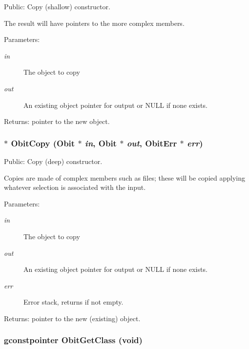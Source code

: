 Public: Copy (shallow) constructor. 

The result will have pointers to the more complex members. \begin{Desc}
\item[Parameters:]
\begin{description}
\item[{\em in}]The object to copy \item[{\em out}]An existing object pointer for output or NULL if none exists. \end{description}
\end{Desc}
\begin{Desc}
\item[Returns:]pointer to the new object. \end{Desc}
\subsubsection{$\ast$ Obit\-Copy ({\bf Obit} $\ast$ {\em in}, {\bf Obit} $\ast$ {\em out}, {\bf Obit\-Err} $\ast$ {\em err})}\label{Obit_8h_a16}


Public: Copy (deep) constructor. 

Copies are made of complex members such as files; these will be copied applying whatever selection is associated with the input. \begin{Desc}
\item[Parameters:]
\begin{description}
\item[{\em in}]The object to copy \item[{\em out}]An existing object pointer for output or NULL if none exists. \item[{\em err}]Error stack, returns if not empty. \end{description}
\end{Desc}
\begin{Desc}
\item[Returns:]pointer to the new (existing) object. \end{Desc}
\subsubsection{\setlength{\rightskip}{0pt plus 5cm}gconstpointer Obit\-Get\-Class (void)}\label{Obit_8h_a15}


